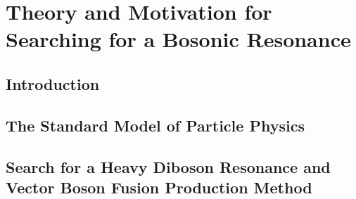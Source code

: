 
\chapter{Theory and Motivation for Searching for a Bosonic Resonance}

\section{Introduction}

\section{The Standard Model of Particle Physics}

\section{Search for a Heavy Diboson Resonance and Vector Boson Fusion Production Method}
